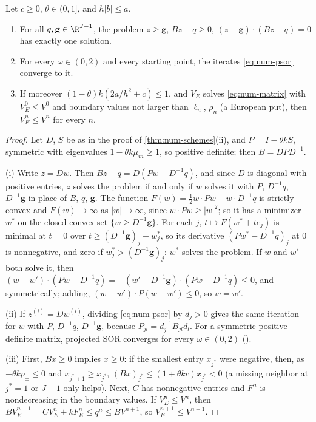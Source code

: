 \begin{proposition}\label{prop:num-american-grid}
Let $c\ge0$, $\theta\in(0,1]$, and $h|b|\le a$.
\begin{enumerate}[label=(\roman*)]
  \item For all $q,\mathbf g\in\R^{J-1}$, the problem $z\ge\mathbf g$, $Bz-q\ge0$,
    $(z-\mathbf g)\cdot(Bz-q)=0$ has exactly one solution.
  \item For every $\omega\in(0,2)$ and every starting point, the iterates \eqref{eq:num-psor}
    converge to it.
  \item If moreover $(1-\theta)k(2a/h^2+c)\le1$, and $V_E$ solves \eqref{eq:num-matrix} with
    $V^0_E\le V^0$ and boundary values not larger than $\ell_n$, $\rho_n$ (a European put), then
    $V^n_E\le V^n$ for every $n$.
\end{enumerate}
\end{proposition}

\begin{proof}
Let $D$, $S$ be as in the proof of \cref{thm:num-schemes}(ii), and $P=I-\theta kS$, symmetric with
eigenvalues $1-\theta k\mu_m\ge1$, so positive definite; then $B=DPD^{-1}$.

(i) Write $z=Dw$. Then $Bz-q=D(Pw-D^{-1}q)$, and since $D$ is diagonal with positive entries, $z$ solves
the problem if and only if $w$ solves it with $P$, $D^{-1}q$, $D^{-1}\mathbf g$ in place of $B$, $q$, $\mathbf g$.
The function $F(w)=\frac12w\cdot Pw-w\cdot D^{-1}q$ is strictly convex and $F(w)\to\infty$ as $|w|\to\infty$,
since $w\cdot Pw\ge|w|^2$; so it has a minimizer $w^*$ on the closed convex set $\{w\ge D^{-1}\mathbf g\}$.
For each $j$, $t\mapsto F(w^*+te_j)$ is minimal at $t=0$ over $t\ge(D^{-1}\mathbf g)_j-w^*_j$, so its
derivative $(Pw^*-D^{-1}q)_j$ at $0$ is nonnegative, and zero if $w^*_j>(D^{-1}\mathbf g)_j$: $w^*$ solves
the problem. If $w$ and $w'$ both solve it, then
$(w-w')\cdot(Pw-D^{-1}q)=-(w'-D^{-1}\mathbf g)\cdot(Pw-D^{-1}q)\le0$, and symmetrically; adding,
$(w-w')\cdot P(w-w')\le0$, so $w=w'$.

(ii) If $z^{(i)}=Dw^{(i)}$, dividing \eqref{eq:num-psor} by $d_j>0$ gives the same iteration for $w$
with $P$, $D^{-1}q$, $D^{-1}\mathbf g$, because $P_{jl}=d_j^{-1}B_{jl}d_l$. For a symmetric positive definite
matrix, projected SOR converges for every $\omega\in(0,2)$ (\textcite{cryer-1971}).

(iii) First, $Bx\ge0$ implies $x\ge0$: if the smallest entry $x_{j^*}$ were negative, then, as
$-\theta kp_\pm\le0$ and $x_{j^*\pm1}\ge x_{j^*}$, $(Bx)_{j^*}\le(1+\theta kc)x_{j^*}<0$ (a missing neighbor at
$j^*=1$ or $J-1$ only helps). Next, $C$ has nonnegative entries and $F^n$ is nondecreasing in the
boundary values. If $V^n_E\le V^n$, then $BV^{n+1}_E=CV^n_E+kF^n_E\le q^n\le BV^{n+1}$, so
$V^{n+1}_E\le V^{n+1}$.
\end{proof}

